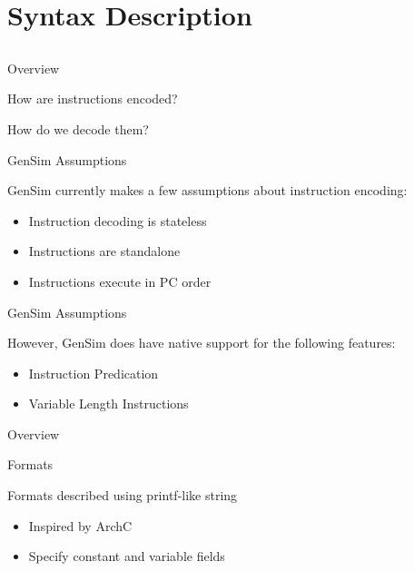 \section{Syntax Description}
\subsection{}

\begin{frame}{Overview}

How are instructions encoded?

How do we decode them?

\end{frame}

\begin{frame}{GenSim Assumptions}

GenSim currently makes a few assumptions about instruction encoding:
\begin{itemize}
\item Instruction decoding is stateless
\item Instructions are standalone
\item Instructions execute in PC order
\end{itemize}

\end{frame}

\begin{frame}{GenSim Assumptions}

However, GenSim does have native support for the following features:
\begin{itemize}
\item Instruction Predication
\item Variable Length Instructions
\end{itemize}

\end{frame}

\begin{frame}{Overview}



\end{frame}

\begin{frame}{Formats}

Formats described using printf-like string
\begin{itemize}
\item Inspired by ArchC
\item Specify constant and variable fields
\end{itemize}

\end{frame}

